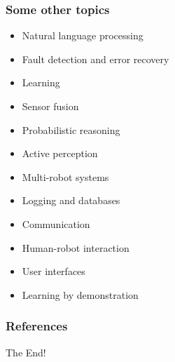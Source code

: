 \documentclass{beamer}
\begin{document}
\begin{frame}
\frametitle{Some other topics}
\begin{itemize}
    \item <1->Natural language processing
    \item <2->Fault detection and error recovery
    \item <3->Learning
    \item <4->Sensor fusion
    \item <5->Probabilistic reasoning
    \item <6->Active perception
    \item <7->Multi-robot systems
    \item <8->Logging and databases
    \item <9->Communication
    \item <10->Human-robot interaction
    \item <11->User interfaces
    \item <12->Learning by demonstration
\end{itemize}
\end{frame}

\appendix
\begin{frame}[allowframebreaks]
        \frametitle{References}
        
        
\end{frame}

\begin{frame}[standout]
     The End!
\end{frame}



\end{document}
